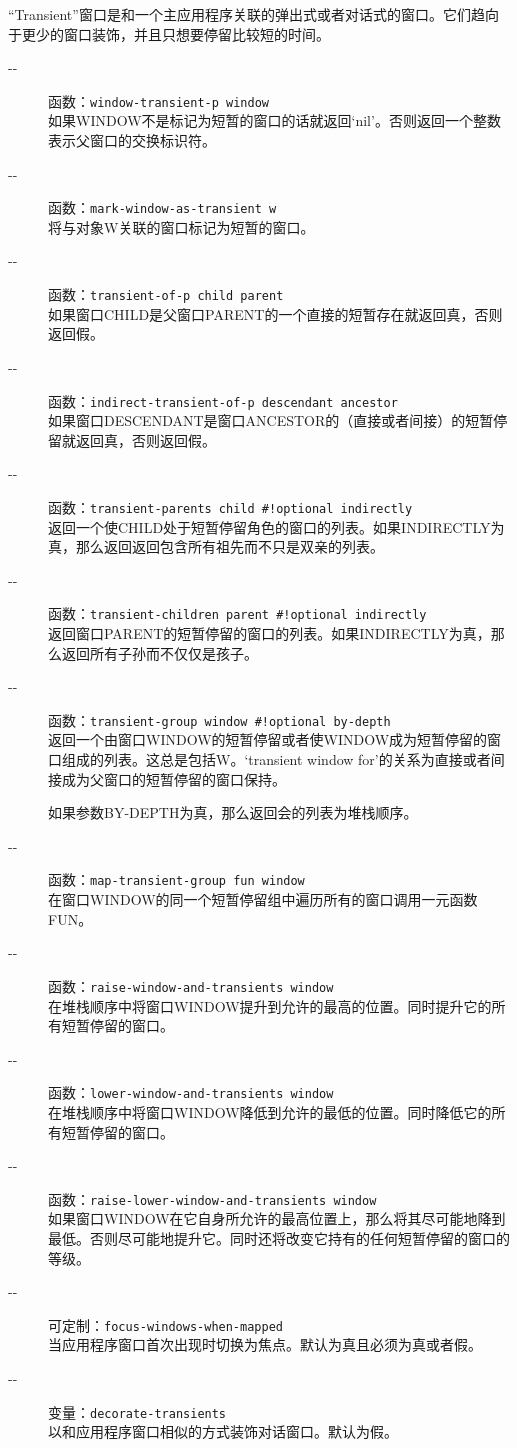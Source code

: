 \documentclass{book}
\begin{document}
\begin{CJK*}{UTF8}{gbsn}
``Transient''窗口是和一个主应用程序关联的弹出式或者对话式的窗口。它们趋向于更少的窗口装饰，并且只想要停留比较短的时间。
\begin{description}
\item[-{}-] 函数：\verb|window-transient-p window|\\
如果WINDOW不是标记为短暂的窗口的话就返回`nil'。否则返回一个整数表示父窗口的交换标识符。
\item[-{}-] 函数：\verb|mark-window-as-transient w|\\
将与对象W关联的窗口标记为短暂的窗口。
\item[-{}-] 函数：\verb|transient-of-p child parent|\\
如果窗口CHILD是父窗口PARENT的一个直接的短暂存在就返回真，否则返回假。
\item[-{}-] 函数：\verb|indirect-transient-of-p descendant ancestor|\\
如果窗口DESCENDANT是窗口ANCESTOR的（直接或者间接）的短暂停留就返回真，否则返回假。
\item[-{}-] 函数：\verb|transient-parents child #!optional indirectly|\\
返回一个使CHILD处于短暂停留角色的窗口的列表。如果INDIRECTLY为真，那么返回返回包含所有祖先而不只是双亲的列表。
\item[-{}-] 函数：\verb|transient-children parent #!optional indirectly|\\
返回窗口PARENT的短暂停留的窗口的列表。如果INDIRECTLY为真，那么返回所有子孙而不仅仅是孩子。
\item[-{}-] 函数：\verb|transient-group window #!optional by-depth|\\
返回一个由窗口WINDOW的短暂停留或者使WINDOW成为短暂停留的窗口组成的列表。这总是包括W。`transient window for'的关系为直接或者间接成为父窗口的短暂停留的窗口保持。

如果参数BY-DEPTH为真，那么返回会的列表为堆栈顺序。
\item[-{}-] 函数：\verb|map-transient-group fun window|\\
在窗口WINDOW的同一个短暂停留组中遍历所有的窗口调用一元函数FUN。
\item[-{}-] 函数：\verb|raise-window-and-transients window|\\
在堆栈顺序中将窗口WINDOW提升到允许的最高的位置。同时提升它的所有短暂停留的窗口。
\item[-{}-] 函数：\verb|lower-window-and-transients window|\\
在堆栈顺序中将窗口WINDOW降低到允许的最低的位置。同时降低它的所有短暂停留的窗口。
\item[-{}-] 函数：\verb|raise-lower-window-and-transients window|\\
如果窗口WINDOW在它自身所允许的最高位置上，那么将其尽可能地降到最低。否则尽可能地提升它。同时还将改变它持有的任何短暂停留的窗口的等级。
\item[-{}-] 可定制：\verb|focus-windows-when-mapped|\\
当应用程序窗口首次出现时切换为焦点。默认为真且必须为真或者假。
\item[-{}-] 变量：\verb|decorate-transients|\\
以和应用程序窗口相似的方式装饰对话窗口。默认为假。
\end{description}


\end{CJK*}
\end{document}
